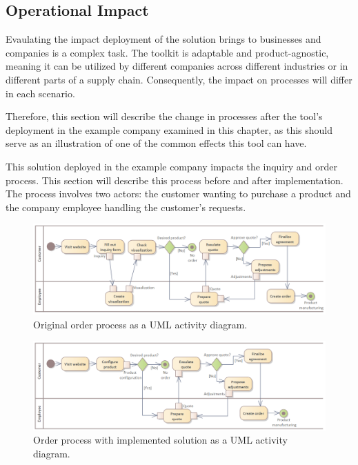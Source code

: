 \subsection{Operational Impact}

Evaulating the impact deployment of the solution brings to businesses and companies is a complex task. The toolkit is adaptable and product-agnostic, meaning it can be utilized by different companies across different industries or in different parts of a supply chain. Consequently, the impact on processes will differ in each scenario.

Therefore, this section will describe the change in processes after the tool's deployment in the example company examined in this chapter, as this should serve as an illustration of one of the common effects this tool can have.

This solution deployed in the example company impacts the inquiry and order process. This section will describe this process before and after implementation. The process involves two actors: the customer wanting to purchase a product and the company employee handling the customer's requests.

\begin{landscape}
\begin{figure}[h!]
\centering
\includegraphics[width=0.78\linewidth]{images/uml_originalactivity.png}
\caption{Original order process as a UML activity diagram.}
\label{fig:uml-originalactivity}
\end{figure}
\begin{figure}[h!]
\centering
\includegraphics[width=0.78\linewidth]{images/uml_newactivity.png}
\caption{Order process with implemented solution as a UML activity diagram.}
\label{fig:uml-newactivity}
\end{figure}
\end{landscape}

